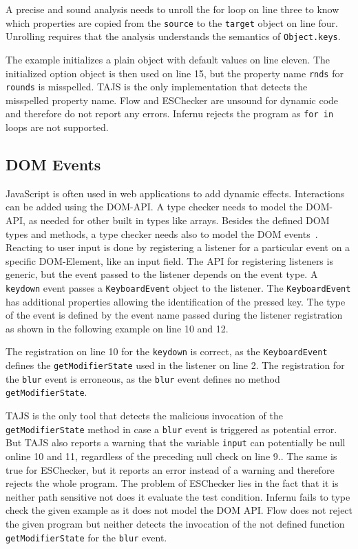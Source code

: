 
A precise and sound analysis needs to unroll the for loop on line three to know which properties are copied from the \texttt{source} to the \texttt{target} object on line four. Unrolling requires that the analysis understands the semantics of \texttt{Object.keys}. 

The example initializes a plain object with default values on line eleven. The initialized option object is then used on line 15, but the property name \texttt{rnds} for \texttt{rounds} is misspelled. TAJS is the only implementation that detects the misspelled property name. Flow and ESChecker are unsound for dynamic code and therefore do not report any errors. Infernu rejects the program as \texttt{for in} loops are not supported.

\subsection{DOM Events}
JavaScript is often used in web applications to add dynamic effects. Interactions can be added using the DOM-API. A type checker needs to model the DOM-API, as needed for other built in types like arrays. Besides the defined DOM types and methods, a type checker needs also to model the DOM events~\cite{JensenMadsenMoller2011}. Reacting to user input is done by registering a listener for a particular event on a specific DOM-Element, like an input field. The API for registering listeners is generic, but the event passed to the listener depends on the event type. A \texttt{keydown} event passes a \texttt{KeyboardEvent} object to the listener. The \texttt{KeyboardEvent} has additional properties allowing the identification of the pressed key. The type of the event is defined by the event name passed during the listener registration as shown in the following example on line 10 and 12.


The registration on line 10 for the \texttt{keydown} is correct, as the \texttt{KeyboardEvent} defines the \texttt{getModifierState} used in the listener on line 2. The registration for the \texttt{blur} event is erroneous, as the \texttt{blur} event defines no method \texttt{getModifierState}. 

TAJS is the only tool that detects the malicious invocation of the \texttt{getModifierState} method in case a \texttt{blur} event is triggered as potential error. But TAJS also reports a warning that the variable \texttt{input} can potentially be null online 10 and 11, regardless of the preceding null check on line 9.. The same is true for ESChecker, but it reports an error instead of a warning and therefore rejects the whole program. The problem of ESChecker lies in the fact that it is neither path sensitive not does it evaluate the test condition. Infernu fails to type check the given example as it does not model the DOM API. Flow does not reject the given program but neither detects the invocation of the not defined function \texttt{getModifierState} for the \texttt{blur} event. 

